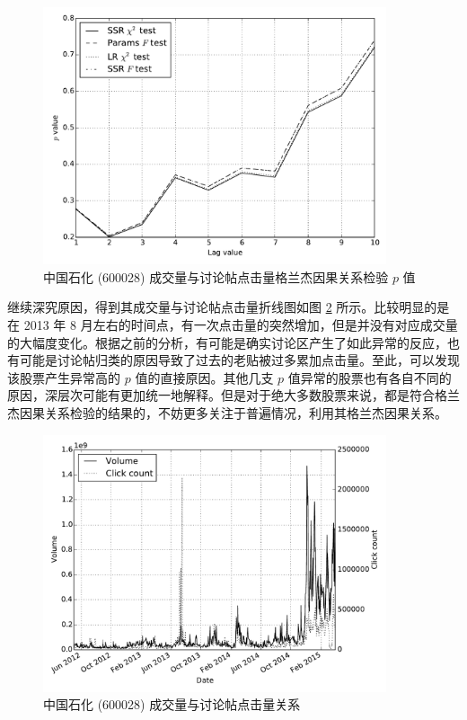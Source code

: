 \begin{figure}
  \centering
  \includegraphics[width=0.9\textwidth]{plots/granger_causality_test_on_sse_50_abnormal_granger.pdf}
  \caption{中国石化 (600028) 成交量与讨论帖点击量格兰杰因果关系检验 $p$ 值}
  \label{granger_causality_test_on_sse_50_abnormal:1}
\end{figure}

继续深究原因，得到其成交量与讨论帖点击量折线图如图 \ref{granger_causality_test_on_sse_50_abnormal:2} 所示。比较明显的是在 2013 年 8 月左右的时间点，有一次点击量的突然增加，但是并没有对应成交量的大幅度变化。根据之前的分析，有可能是确实讨论区产生了如此异常的反应，也有可能是讨论帖归类的原因导致了过去的老贴被过多累加点击量。至此，可以发现该股票产生异常高的 $p$ 值的直接原因。其他几支 $p$ 值异常的股票也有各自不同的原因，深层次可能有更加统一地解释。但是对于绝大多数股票来说，都是符合格兰杰因果关系检验的结果的，不妨更多关注于普遍情况，利用其格兰杰因果关系。

\begin{figure}
  \centering
  \includegraphics[width=0.9\textwidth]{plots/granger_causality_test_on_sse_50_abnormal_plot.pdf}
  \caption{中国石化 (600028) 成交量与讨论帖点击量关系}
  \label{granger_causality_test_on_sse_50_abnormal:2}
\end{figure}

